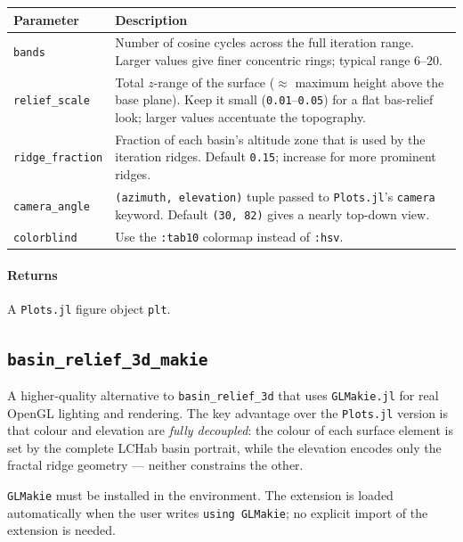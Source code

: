 \documentclass[11pt,a4paper]{article}
\theoremstyle{definition}
\newcommand{\pkg}[1]{\texttt{#1}}
\newcommand{\fn}[1]{\texttt{#1}}
\begin{document}
\begin{center}
\renewcommand{\arraystretch}{1.25}
\begin{tabular}{lp{9cm}}
\toprule
Parameter & Description \\
\midrule
\texttt{bands} &
  Number of cosine cycles across the full iteration range.
  Larger values give finer concentric rings; typical range $6$--$20$.\\
\texttt{relief\_scale} &
  Total $z$-range of the surface ($\approx$ maximum height above the
  base plane).  Keep it small (\texttt{0.01}--\texttt{0.05}) for a
  flat bas-relief look; larger values accentuate the topography.\\
\texttt{ridge\_fraction} &
  Fraction of each basin's altitude zone that is used by the iteration
  ridges.  Default \texttt{0.15}; increase for more prominent ridges.\\
\texttt{camera\_angle} &
  \texttt{(azimuth, elevation)} tuple passed to \pkg{Plots.jl}'s
  \texttt{camera} keyword.  Default \texttt{(30, 82)} gives a nearly
  top-down view.\\
\texttt{colorblind} &
  Use the \texttt{:tab10} colormap instead of \texttt{:hsv}.\\
\bottomrule
\end{tabular}
\end{center}

\paragraph{Returns}
A \pkg{Plots.jl} figure object \texttt{plt}.

\subsection{\fn{basin\_relief\_3d\_makie}}
\label{sec:makie}

A higher-quality alternative to \fn{basin\_relief\_3d} that uses
\pkg{GLMakie.jl} for real OpenGL lighting and rendering.
The key advantage over the \pkg{Plots.jl} version is that colour and
elevation are \emph{fully decoupled}: the colour of each surface element
is set by the complete LCHab basin portrait, while the elevation encodes
only the fractal ridge geometry — neither constrains the other.

\pkg{GLMakie} must be installed in the environment.
The extension is loaded automatically when the user writes
\texttt{using GLMakie}; no explicit import of the extension is needed.
\end{document}
